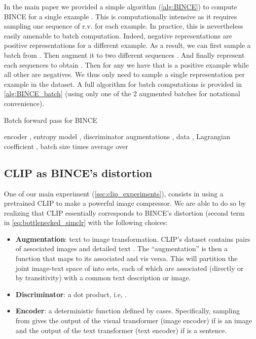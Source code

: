 \documentclass[final]{article}
\begin{document}
In the main paper we provided a simple algorithm (\cref{alg:BINCE}) to compute BINCE for a single example .
This is computationally intensive as it requires sampling one sequence of r.v. for each example.
In practice, this is nevertheless easily amenable to batch computation.
Indeed, negative representations   are positive representations  for a different example.
As a result, we can first sample a batch   from .
Then augment it to two different sequences .
And finally represent each sequences to obtain .
Then for any  we have that  is a positive example while all other  are negatives.
We thus only need to sample a single representation per example in the dataset.
A full algorithm for batch computations is provided in \cref{alg:BINCE_batch} (using only one of the 2 augmented batches for notational convenience).


\begin{algorithm}[t]
\caption{Batch forward pass for BINCE}
\label{alg:BINCE_batch}
    \begin{algorithmic}[1]
    \Require encoder ,  entropy model , discriminator 
    \Require augmentations , data , Lagrangian coefficient , batch size  
    \State  times   
    \State  {}
    \State  {}
    \State  {}
    \State 
    \State  average  over  
    \State 
    \For{}
    \State  {} 
    \State  {} 
    \State  {} 
    \EndFor{}
    \Return 
\end{algorithmic}
\end{algorithm} 

\subsection{CLIP as BINCE's distortion}
\label{appx:clip_bince}

One of our main experiment (\cref{sec:clip_experiments}), consists in using a pretrained CLIP to make a powerful image compressor.
We are able to do so by realizing that CLIP essentially corresponds to BINCE's distortion (second term in \cref{eq:bottlenecked_simclr} with the following choices: 
\begin{itemize}
\item \textbf{Augmentation}: text to image transformation. CLIP’s dataset contains pairs of associated images and detailed text  . The ``augmentation'' is then a function that maps  to its associated   and vis versa.
This will partition the joint image-text space of  into sets, each of which are associated (directly or by transitivity) with a common text description or image.
\item \textbf{Discriminator}: a dot product, i.e, .
\item \textbf{Encoder}: a deterministic function defined by cases. Specifically, sampling from  gives the output of the visual transformer (image encoder)  if  is an image and the output of the text transformer (text encoder)  if  is a sentence.
\end{itemize}
\end{document}
